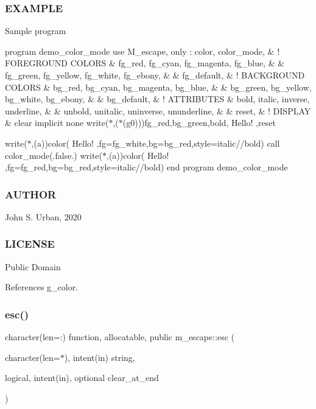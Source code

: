 \subsubsection*{E\+X\+A\+M\+P\+LE}

Sample program

program demo\+\_\+color\+\_\+mode use M\+\_\+escape, only \+: color, color\+\_\+mode, \& ! F\+O\+R\+E\+G\+R\+O\+U\+ND C\+O\+L\+O\+RS \& fg\+\_\+red, fg\+\_\+cyan, fg\+\_\+magenta, fg\+\_\+blue, \& \& fg\+\_\+green, fg\+\_\+yellow, fg\+\_\+white, fg\+\_\+ebony, \& \& fg\+\_\+default, \& ! B\+A\+C\+K\+G\+R\+O\+U\+ND C\+O\+L\+O\+RS \& bg\+\_\+red, bg\+\_\+cyan, bg\+\_\+magenta, bg\+\_\+blue, \& \& bg\+\_\+green, bg\+\_\+yellow, bg\+\_\+white, bg\+\_\+ebony, \& \& bg\+\_\+default, \& ! A\+T\+T\+R\+I\+B\+U\+T\+ES \& bold, italic, inverse, underline, \& \& unbold, unitalic, uninverse, ununderline, \& \& reset, \& ! D\+I\+S\+P\+L\+AY \& clear implicit none write($\ast$,\textquotesingle{}($\ast$(g0))\textquotesingle{})fg\+\_\+red,bg\+\_\+green,bold,\textquotesingle{} Hello! \textquotesingle{},reset

write($\ast$,\textquotesingle{}(a)\textquotesingle{})color(\textquotesingle{} Hello! \textquotesingle{},fg=fg\+\_\+white,bg=bg\+\_\+red,style=italic//bold) call color\+\_\+mode(.false.) write($\ast$,\textquotesingle{}(a)\textquotesingle{})color(\textquotesingle{} Hello! \textquotesingle{},fg=fg\+\_\+red,bg=bg\+\_\+red,style=italic//bold) end program demo\+\_\+color\+\_\+mode

\subsubsection*{A\+U\+T\+H\+OR}

John S. Urban, 2020 \subsubsection*{L\+I\+C\+E\+N\+SE}

Public Domain 

References g\+\_\+color.

\mbox{\label{namespacem__escape_a36f016baad6b23f86189e6f3ee6db0cb}} 
\subsubsection{\texorpdfstring{esc()}{esc()}}
{\footnotesize\ttfamily character(len=\+:) function, allocatable, public m\+\_\+escape\+::esc (\begin{DoxyParamCaption}\item[{character(len=$\ast$), intent(in)}]{string,  }\item[{logical, intent(in), optional}]{clear\+\_\+at\+\_\+end }\end{DoxyParamCaption})}




